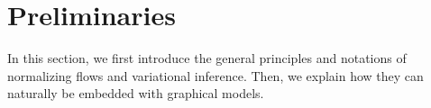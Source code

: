 \documentclass{article} %
\begin{document}

\vspace{-0.05in}
\section{Preliminaries}\label{sec:prelim}
\vspace{-0.05in}
In this section, we first introduce the general principles and notations of normalizing flows and variational inference. 
Then, we explain how they can naturally be embedded with graphical models.
\end{document}
